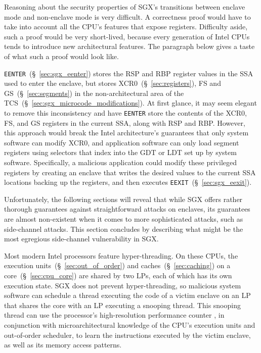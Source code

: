 Reasoning about the security properties of SGX's transitions between enclave
mode and non-enclave mode is very difficult. A correctness proof would have to
take into account all the CPU's features that expose registers. Difficulty
aside, such a proof would be very short-lived, because every generation of
Intel CPUs tends to introduce new architectural features. The paragraph below
gives a taste of what such a proof would look like.

\texttt{EENTER}~(\S~\ref{sec:sgx_eenter}) stores the RSP and RBP register
values in the SSA used to enter the enclave, but stores
XCR0~(\S~\ref{sec:registers}), FS and GS~(\S~\ref{sec:segments}) in the
non-architectural area of the TCS~(\S~\ref{sec:sgx_microcode_modifications}).
At first glance, it may seem elegant to remove this inconsistency and have
\texttt{EENTER} store the contents of the XCR0, FS, and GS registers in the
current SSA, along with RSP and RBP. However, this approach would break the
Intel architecture's guarantees that only system software can modify XCR0, and
application software can only load segment registers using selectors that index
into the GDT or LDT set up by system software.  Specifically, a malicious
application could modify these privileged registers by creating an enclave that
writes the desired values to the current SSA locations backing up the
registers, and then executes \texttt{EEXIT}~(\S~\ref{sec:sgx_eexit}).

Unfortunately, the following sections will reveal that while SGX offers rather
thorough guarantees against straightforward attacks on enclaves, its guarantees
are almost non-existent when it comes to more sophisticated attacks, such as
side-channel attacks. This section concludes by describing what might be the
most egregious side-channel vulnerability in SGX.

Most modern Intel processors feature hyper-threading. On these CPUs, the
execution units~(\S~\ref{sec:out_of_order}) and caches~(\S~\ref{sec:caching})
on a core~(\S~\ref{sec:cpu_core}) are shared by two LPs, each of which has its
own execution state. SGX does not prevent hyper-threading, so malicious system
software can schedule a thread executing the code of a victim enclave on an
LP that shares the core with an LP executing a snooping thread. This snooping
thread can use the processor's high-resolution performance counter
\cite{petters1999making}, in conjunction with microarchitectural knowledge of
the CPU's execution units and out-of-order scheduler, to learn the instructions
executed by the victim enclave, as well as its memory access patterns.

